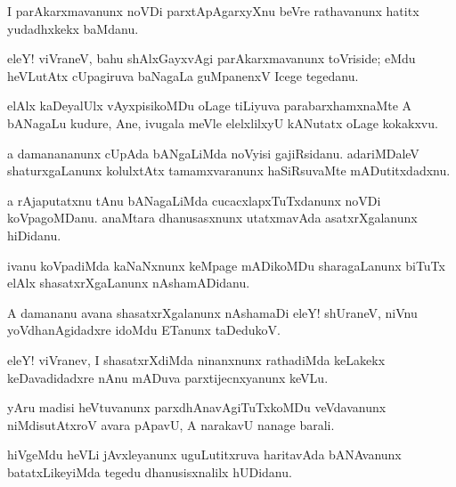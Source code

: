 \documentclass{article}
\begin{document}
\begin{mn}%
I parAkarxmavanunx noVDi parxtApAgarxyXnu beVre rathavanunx hatitx yudadhxkekx baMdanu.
\end{mn}

\begin{mn}%
eleY! viVraneV, bahu shAlxGayxvAgi parAkarxmavanunx toVriside; eMdu heVLutAtx cUpagiruva 
baNagaLa guMpanenxV Icege tegedanu.
\end{mn}

\begin{mn}%
elAlx kaDeyalUlx vAyxpisikoMDu oLage tiLiyuva parabarxhamxnaMte A bANagaLu kudure, Ane, 
ivugala meVle elelxlilxyU kANutatx oLage kokakxvu.
\end{mn}

\begin{mn}%
a damanananunx cUpAda bANgaLiMda noVyisi gajiRsidanu. adariMDaleV shaturxgaLanunx 
kolulxtAtx tamamxvaranunx haSiRsuvaMte mADutitxdadxnu.
\end{mn}

\begin{mn}%
a rAjaputatxnu tAnu bANagaLiMda cucacxlapxTuTxdanunx noVDi koVpagoMDanu. anaMtara 
dhanusasxnunx utatxmavAda asatxrXgalanunx hiDidanu.
\end{mn}

\begin{mn}%
ivanu koVpadiMda kaNaNxnunx keMpage mADikoMDu sharagaLanunx biTuTx elAlx shasatxrXgaLanunx 
nAshamADidanu.
\end{mn}

\begin{mn}%
A damananu avana shasatxrXgalanunx nAshamaDi eleY! shUraneV, niVnu yoVdhanAgidadxre idoMdu 
ETanunx taDedukoV.
\end{mn}

\begin{mn}%
eleY! viVranev, I shasatxrXdiMda ninanxnunx rathadiMda keLakekx keDavadidadxre nAnu mADuva 
parxtijecnxyanunx keVLu.
\end{mn}

\begin{mn}%
yAru madisi heVtuvanunx parxdhAnavAgiTuTxkoMDu veVdavanunx niMdisutAtxroV avara pApavU, A 
narakavU nanage barali.
\end{mn}

\begin{mn}%
hiVgeMdu heVLi jAvxleyanunx uguLutitxruva haritavAda bANAvanunx batatxLikeyiMda tegedu 
dhanusisxnalilx hUDidanu.
\end{mn}
\end{document}

